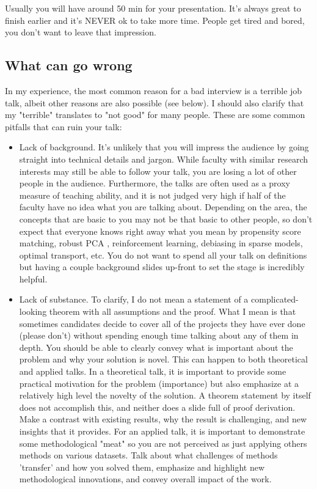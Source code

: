 \documentclass{article}
\begin{document}
Usually you will have around 50 min for your presentation. It's always great to finish earlier and it's NEVER ok to take more time. People get tired and bored, you don't want to leave that impression.

{\color{red}
\subsection{What can go wrong}

In my experience, the most common reason for a bad interview is a terrible job talk, albeit other reasons are also possible (see below). I should also clarify that my "terrible" translates to "not good" for many people. These are some common pitfalls that can ruin your talk:

\begin{itemize}
\item Lack of background. It's unlikely that you will impress the audience by going straight into technical details and jargon. While faculty with similar research interests may still be able to follow your talk, you are losing a lot of other people in the audience. Furthermore, the talks are often used as a proxy measure of teaching ability, and it is not judged very high if half of the faculty have no idea what you are talking about. Depending on the area, the concepts that are basic to you may not be that basic to other people, so don't expect that everyone knows right away what you mean by propensity score matching, robust PCA , reinforcement learning, debiasing in sparse models, optimal transport, etc. You do not want to spend all your talk on definitions but having a couple background slides up-front to set the stage is incredibly helpful.

\item Lack of substance. To clarify, I do not mean a statement of a complicated-looking theorem with all assumptions and the proof. What I mean is that sometimes candidates decide to cover all of the projects they have ever done (please don't) without spending enough time talking about any of them in depth. You should be able to clearly convey what is important about the problem and why your solution is novel. This can happen to both theoretical and applied talks. In a theoretical talk, it is important to provide some practical motivation for the problem (importance) but also emphasize at a relatively high level the novelty of the solution. A theorem statement by itself does not accomplish this, and neither does a slide full of proof derivation. Make a contrast with existing results, why the result is challenging, and new insights that it provides. For an applied talk, it is important to demonstrate some methodological "meat" so you are not perceived as just applying others methods on various datasets. Talk about what challenges of methods 'transfer' and how you solved them, emphasize and highlight new methodological innovations, and convey overall impact of the work.


\end{itemize}}
\end{document}
